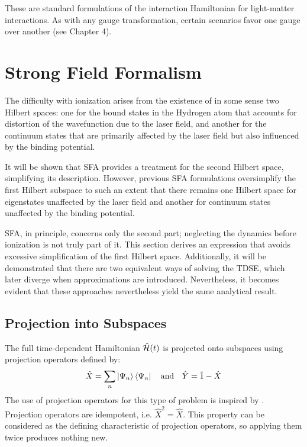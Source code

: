These are standard formulations of the interaction Hamiltonian for light-matter interactions. 
As with any gauge transformation, certain scenarios favor one gauge over another (see Chapter 4).











\section{Strong Field Formalism}

The difficulty with ionization arises from the existence of in some sense two Hilbert spaces: 
one for the bound states in the Hydrogen atom that accounts for distortion of the wavefunction due to the laser field, and another for the continuum states that are primarily affected by the laser field but also influenced by the binding potential.

It will be shown that SFA provides a treatment for the second Hilbert space, simplifying its description. 
However, previous SFA formulations oversimplify the first Hilbert subspace to such an extent that there remains one Hilbert space for eigenstates unaffected by the laser field and another for continuum states unaffected by the binding potential.

SFA, in principle, concerns only the second part; neglecting the dynamics before ionization is not truly part of it.
This section derives an expression that avoids excessive simplification of the first Hilbert space.
Additionally, it will be demonstrated that there are two equivalent ways of solving the TDSE, which later diverge when approximations are introduced.
Nevertheless, it becomes evident that these approaches nevertheless yield the same analytical result.









\subsection{Projection into Subspaces}
The full time-dependent Hamiltonian $\hat{\mathcal{H}}(t)$ is projected onto subspaces using projection operators defined by:
\begin{equation*}   
    \hat{X} = \sum_{n}\ket{\Psi_n}\bra{\Psi_n}\quad\text{and}\quad\hat{Y}= \hat{1} - \hat{X}
\end{equation*}
The use of projection operators for this type of problem is inspired by \cite{feshbachmethod}.
Projection operators are idempotent, i.e. $\hat{X}^2=\hat{X}$.
This property can be considered as the defining characteristic of projection operators, so applying them twice produces nothing new.

